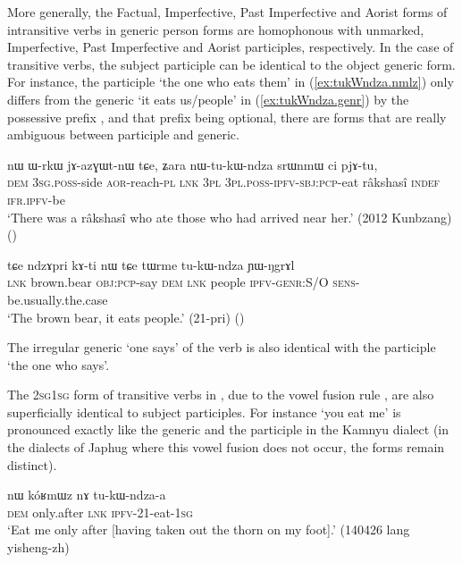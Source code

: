 More generally, the Factual, Imperfective, Past Imperfective and Aorist forms of intransitive verbs in generic person forms are homophonous with unmarked, Imperfective, Past Imperfective and Aorist participles, respectively. In the case of transitive verbs, the subject participle can be identical to the object generic form. For instance, the participle  `the one who eats them' in (\ref{ex:tukWndza.nmlz}) only differs from the generic  `it eats us/people' in  (\ref{ex:tukWndza.genr}) by the possessive prefix , and that prefix being optional, there are forms that are really ambiguous between participle and generic. 

\begin{exe}
\ex \label{ex:tukWndza.nmlz}
 \gll nɯ ɯ-rkɯ jɤ-azɣɯt-nɯ tɕe, ʑara nɯ-tu-kɯ-ndza srɯnmɯ ci pjɤ-tu, \\
 \textsc{dem} \textsc{3sg}.\textsc{poss}-side \textsc{aor}-reach-\textsc{pl} \textsc{lnk} \textsc{3pl} \textsc{3pl}.\textsc{poss}-\textsc{ipfv}-\textsc{sbj}:\textsc{pcp}-eat râkshasî \textsc{indef} \textsc{ifr}.\textsc{ipfv}-be \\
\glt `There was a râkshasî who ate those who had arrived near her.' (2012 Kunbzang) ()
\end{exe}

\begin{exe}
\ex \label{ex:tukWndza.genr}
 \gll tɕe ndzɤpri kɤ-ti nɯ tɕe tɯrme tu-kɯ-ndza ɲɯ-ŋgrɤl  \\
 \textsc{lnk} brown.bear \textsc{obj}:\textsc{pcp}-say \textsc{dem} \textsc{lnk} people \textsc{ipfv}-\textsc{genr}:S/O \textsc{sens}-be.usually.the.case \\
\glt `The brown bear, it eats people.' (21-pri)
()
\end{exe}
 
The irregular generic  `one says' of the verb  is also identical with the participle `the one who says'.

The \textsc{2sg}\fl{}\textsc{1sg} form of transitive verbs in , due to the vowel fusion rule  \fl{} , are also superficially identical to subject participles. For instance  `you eat me' is pronounced  exactly like the generic and the participle  in the Kamnyu dialect (in the dialects of Japhug where this vowel fusion does not occur, the forms remain distinct).

\begin{exe}
\ex \label{ex:tukWndzaa}
 \gll nɯ kóʁmɯz nɤ tu-kɯ-ndza-a \\
 \textsc{dem} only.after \textsc{lnk} \textsc{ipfv}-2\fl{}1-eat-\textsc{1sg} \\
 \glt `Eat me only after [having taken out the thorn on my foot].' (140426 lang yisheng-zh)
\end{exe} 

